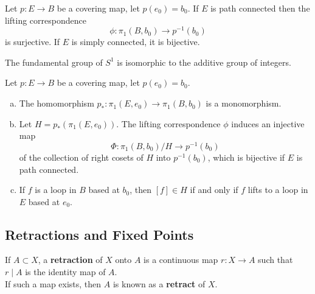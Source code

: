 \begin{theorem}
Let $p\colon E \rightarrow B$ be a covering map, let $p(e_0) = b_0$. If $E$ is path connected then the lifting correspondence 
\[
    \phi\colon \pi _1(B, b_0) \rightarrow p^{-1}(b_0)
\]
is surjective. If $E$ is simply connected, it is bijective.
\end{theorem}

\begin{theorem}
The fundamental group of $S^1$ is isomorphic to the additive group of integers.
\end{theorem}

\begin{theorem}
Let $p\colon E \rightarrow B$ be a covering map, let $p(e_0) = b_0$.
\begin{enumerate}[a)]
    \item The homomorphism $p_{\ast} \colon \pi _1(E, e_0) \rightarrow \pi _1(B, b_0)$ is a monomorphism.
    \item Let $H = p_{\ast} (\pi _1(E, e_0))$. The lifting correspondence $\phi$ induces an injective map
    \[
        \Phi\colon \pi _1(B, b_0) / H \rightarrow p^{-1}(b_0)
    \]
    of the collection of right cosets of $H$ into $p^{-1}(b_0)$, which is bijective if $E$ is path connected.
    \item If $f$ is a loop in $B$ based at $b_0$, then $[f] \in H$ if and only if $f$ lifts to a loop in $E$ based at $e_0$.
\end{enumerate}
\end{theorem}


\subsection{Retractions and Fixed Points}

\begin{definition}
If $A \subset X$, a \textbf{retraction} of $X$ onto $A$ is a continuous map $r\colon X \rightarrow  A$ such that $r \mid A$ is the identity map of $A$. \\

If such a map exists, then $A$ is known as a \textbf{retract} of $X$.
\end{definition}


